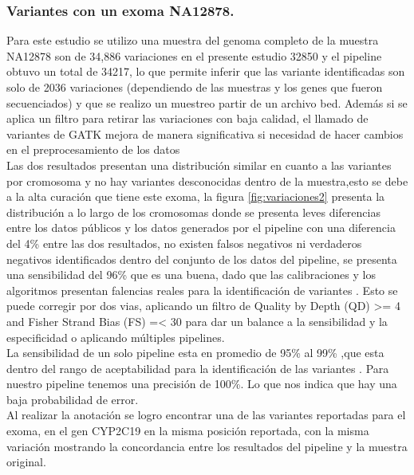 \subsubsection*{Variantes con un exoma NA12878.}

Para este estudio se utilizo una muestra del genoma completo de la muestra NA12878 son de 34,886 variaciones \cite{Cornish2015} en el presente estudio 32850 y el pipeline obtuvo un total de 34217, lo que permite inferir que las variante identificadas son solo de 2036 variaciones (dependiendo de las muestras y los genes que fueron secuenciados) y que se realizo un muestreo partir de un archivo bed. Además si se aplica un filtro para retirar las variaciones con baja calidad, el llamado de variantes de GATK mejora de manera significativa si necesidad de hacer cambios en el preprocesamiento de los datos \cite{Warden2014} \\

Las dos resultados presentan una distribución similar en cuanto a las variantes por cromosoma y no hay variantes desconocidas dentro de la muestra,esto se debe a la alta curación que tiene este exoma, la figura \ref{fig:variaciones2} presenta la distribución a lo largo de los cromosomas donde se presenta leves diferencias entre los datos públicos y los datos generados por el pipeline con una diferencia del 4\% entre las dos resultados, no existen falsos negativos ni verdaderos negativos identificados dentro del conjunto de los datos del pipeline, se presenta una sensibilidad del 96\% que es una buena, dado que las calibraciones y los algoritmos presentan falencias reales para la identificación de variantes \cite{Auwera2014}. Esto se puede corregir por dos vias, aplicando un filtro de Quality by Depth (QD) >= 4 and Fisher Strand Bias (FS) =< 30 para dar un balance  a la sensibilidad y la especificidad \cite{Tsai2016} o aplicando múltiples pipelines.\\


La sensibilidad de un solo pipeline esta en promedio de 95\% al 99\% ,que esta dentro del rango de aceptabilidad para la identificación de las variantes \cite{Liu2013}. Para nuestro pipeline tenemos una precisión de 100\%. Lo que nos indica que hay  una baja probabilidad de error.\\

Al realizar la anotación se logro encontrar una de las variantes reportadas para el exoma, en el gen CYP2C19 en la misma posición reportada, con la misma variación mostrando la concordancia entre los resultados del pipeline y la muestra original. \\


